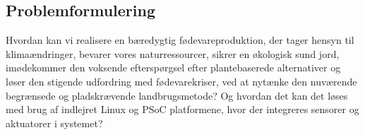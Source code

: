 \subsection{Problemformulering}

Hvordan kan vi realisere en bæredygtig fødevareproduktion, der tager hensyn til klimaændringer, bevarer vores naturressourcer, sikrer en økologisk sund jord, imødekommer den voksende efterspørgsel efter plantebaserede alternativer og løser den stigende udfordring med fødevarekriser, ved at nytænke den nuværende begrænsede og pladskrævende landbrugsmetode?
Og hvordan det kan det løses med brug af indlejret Linux og PSoC platformene, hvor der integreres sensorer og aktuatorer i systemet?
